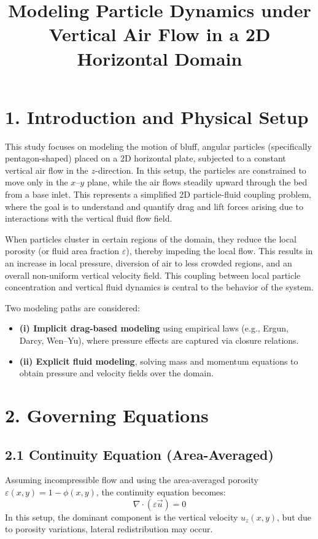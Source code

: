 \documentclass[12pt]{article}
\title{Modeling Particle Dynamics under Vertical Air Flow in a 2D Horizontal Domain}
\author{}
\date{}
\begin{document}
\maketitle

\section*{1. Introduction and Physical Setup}
This study focuses on modeling the motion of bluff, angular particles (specifically pentagon-shaped) placed on a 2D horizontal plate, subjected to a constant vertical air flow in the \( z \)-direction. In this setup, the particles are constrained to move only in the \( x \)--\( y \) plane, while the air flows steadily upward through the bed from a base inlet. This represents a simplified 2D particle-fluid coupling problem, where the goal is to understand and quantify drag and lift forces arising due to interactions with the vertical fluid flow field.

When particles cluster in certain regions of the domain, they reduce the local porosity (or fluid area fraction \( \varepsilon \)), thereby impeding the local flow. This results in an increase in local pressure, diversion of air to less crowded regions, and an overall non-uniform vertical velocity field. This coupling between local particle concentration and vertical fluid dynamics is central to the behavior of the system.

Two modeling paths are considered:
\begin{itemize}
    \item \textbf{(i) Implicit drag-based modeling} using empirical laws (e.g., Ergun, Darcy, Wen--Yu), where pressure effects are captured via closure relations.
    \item \textbf{(ii) Explicit fluid modeling}, solving mass and momentum equations to obtain pressure and velocity fields over the domain.
\end{itemize}

\section*{2. Governing Equations}

\subsection*{2.1 Continuity Equation (Area-Averaged)}
Assuming incompressible flow and using the area-averaged porosity \( \varepsilon(x, y) = 1 - \phi(x, y) \), the continuity equation becomes:
\[
\nabla \cdot (\varepsilon \vec{u}) = 0
\]
In this setup, the dominant component is the vertical velocity \( u_z(x, y) \), but due to porosity variations, lateral redistribution may occur.
\end{document}
